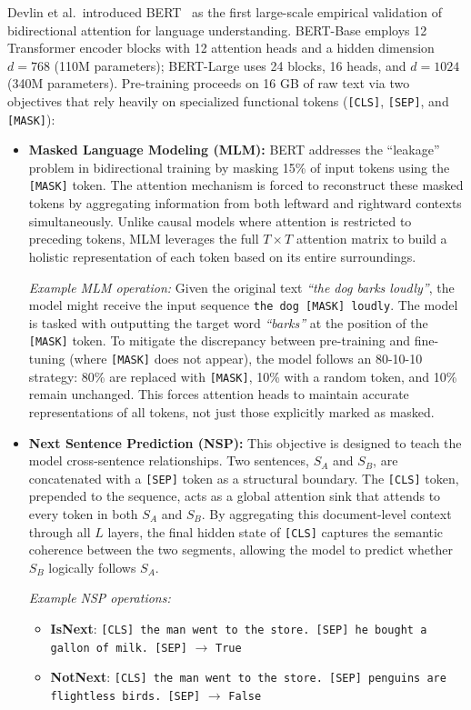 \documentclass[11pt]{article}
\begin{document}
Devlin et al.\ introduced BERT~\cite{devlin2018bert} as the first large-scale empirical validation of bidirectional attention for language understanding. BERT-Base employs 12 Transformer encoder blocks with 12 attention heads and a hidden dimension $d = 768$ (110M parameters); BERT-Large uses 24 blocks, 16 heads, and $d = 1024$ (340M parameters). Pre-training proceeds on 16 GB of raw text via two objectives that rely heavily on specialized functional tokens (\texttt{[CLS]}, \texttt{[SEP]}, and \texttt{[MASK]}):
\begin{itemize}
  \item \textbf{Masked Language Modeling (MLM):} BERT addresses the ``leakage'' problem in bidirectional training by masking 15\% of input tokens using the \texttt{[MASK]} token. The attention mechanism is forced to reconstruct these masked tokens by aggregating information from both leftward and rightward contexts simultaneously. Unlike causal models where attention is restricted to preceding tokens, MLM leverages the full $T \times T$ attention matrix to build a holistic representation of each token based on its entire surroundings. 
  
  \textit{Example MLM operation:} Given the original text \textit{``the dog barks loudly''}, the model might receive the input sequence \texttt{the dog [MASK] loudly}. The model is tasked with outputting the target word \textit{``barks''} at the position of the \texttt{[MASK]} token. To mitigate the discrepancy between pre-training and fine-tuning (where \texttt{[MASK]} does not appear), the model follows an 80-10-10 strategy: 80\% are replaced with \texttt{[MASK]}, 10\% with a random token, and 10\% remain unchanged. This forces attention heads to maintain accurate representations of all tokens, not just those explicitly marked as masked.
  
  \item \textbf{Next Sentence Prediction (NSP):} This objective is designed to teach the model cross-sentence relationships. Two sentences, $S_A$ and $S_B$, are concatenated with a \texttt{[SEP]} token as a structural boundary. The \texttt{[CLS]} token, prepended to the sequence, acts as a global attention sink that attends to every token in both $S_A$ and $S_B$. By aggregating this document-level context through all $L$ layers, the final hidden state of \texttt{[CLS]} captures the semantic coherence between the two segments, allowing the model to predict whether $S_B$ logically follows $S_A$.
  
  \textit{Example NSP operations:}
  \begin{itemize}
      \item \textbf{IsNext}: \texttt{[CLS] the man went to the store. [SEP] he bought a gallon of milk. [SEP]} $\rightarrow$ \texttt{True}
      \item \textbf{NotNext}: \texttt{[CLS] the man went to the store. [SEP] penguins are flightless birds. [SEP]} $\rightarrow$ \texttt{False}
  \end{itemize}
\end{itemize}
\end{document}
